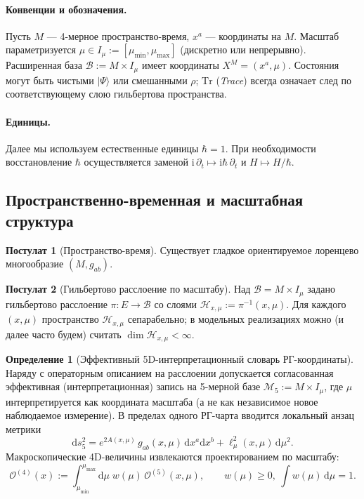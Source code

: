 \documentclass[11pt,a4paper]{article}
\newcommand{\ii}{\mathrm{i}}
\newcommand{\dd}{\mathrm{d}}
\theoremstyle{definition}
\newtheorem{definition}{Определение}[section]
\newtheorem{axiom}{Постулат}[section]
\theoremstyle{plain}
\theoremstyle{remark}
\begin{document}
\paragraph{Конвенции и обозначения.}
Пусть $M$ — 4-мерное пространство-время, $x^a$ — координаты на $M$.
Масштаб параметризуется $\mu\in I_\mu:=[\mu_{\min},\mu_{\max}]$ (дискретно или непрерывно).
Расширенная база $\mathcal B := M\times I_\mu$ имеет координаты $X^M=(x^a,\mu)$.
Состояния могут быть чистыми $|\Psi\rangle$ или смешанными $\rho$; $\mathrm{Tr}$ (\textit{Trace}) всегда означает след по соответствующему слою гильбертова пространства.

\paragraph{Единицы.}
Далее мы используем естественные единицы $\hbar=1$.
При необходимости восстановление $\hbar$ осуществляется заменой
$\ii\,\partial_t \mapsto \ii\hbar\,\partial_t$ и $H\mapsto H/\hbar$.

\subsection{Пространственно-временная и масштабная структура}
\label{sec:axioms:structure}

\begin{axiom}[Пространство-время]\label{ax:spacetime}
Существует гладкое ориентируемое лоренцево многообразие $(M,g_{ab})$.
\end{axiom}

\begin{axiom}[Гильбертово расслоение по масштабу]\label{ax:hilbertbundle}
Над $\mathcal B=M\times I_\mu$ задано гильбертово расслоение $\pi:E\to\mathcal B$ со слоями
$\mathcal H_{x,\mu}:=\pi^{-1}(x,\mu)$.
Для каждого $(x,\mu)$ пространство $\mathcal H_{x,\mu}$ сепарабельно; в модельных реализациях можно (и далее часто будем) считать
$\dim\mathcal H_{x,\mu}<\infty$.
\end{axiom}

\begin{definition}[Эффективный 5D-интерпретационный словарь РГ-координаты]\label{ax:5dRG}
Наряду с операторным описанием на расслоении допускается согласованная эффективная (интерпретационная) запись
на 5-мерной базе
$\mathcal M_5:=M\times I_\mu$,
где $\mu$ интерпретируется как координата масштаба (а не как независимое новое наблюдаемое измерение).
В пределах одного РГ-чарта вводится локальный анзац метрики
\begin{equation}\label{eq:metric5d_ansatz}
\dd s_5^2
=
e^{2A(x,\mu)}\,g_{ab}(x,\mu)\,\dd x^a\dd x^b
+\ell_\mu^2(x,\mu)\,\dd\mu^2.
\end{equation}
Макроскопические 4D-величины извлекаются проектированием по масштабу:
\begin{equation}\label{eq:proj5d_to_4d}
\mathcal O^{(4)}(x)
:=
\int_{\mu_{\min}}^{\mu_{\max}}\dd\mu\;w(\mu)\,\mathcal O^{(5)}(x,\mu),
\qquad
w(\mu)\ge 0,\ \int w(\mu)\,\dd\mu=1.
\end{equation}
\end{definition}
\end{document}
